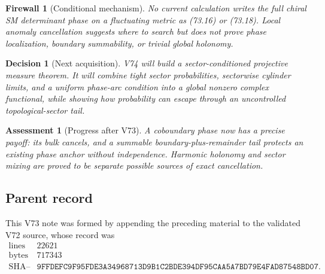 \documentclass[11pt]{article}
\newtheorem{assessment}[theorem]{Assessment}
\newtheorem{firewall}[theorem]{Firewall}
\newtheorem{decision}[theorem]{Decision}
\begin{document}
\begin{firewall}[Conditional mechanism]
\label{fire:v11v73-boundary}
No current calculation writes the full chiral SM determinant phase on
a fluctuating metric as (73.16) or (73.18).  Local anomaly cancellation
suggests where to search but does not prove phase localization,
boundary summability, or trivial global holonomy.
\end{firewall}

\begin{decision}[Next acquisition]
\label{dec:v11v73-next}
V74 will build a sector-conditioned projective measure theorem.  It
will combine tight sector probabilities, sectorwise cylinder limits,
and a uniform phase-arc condition into a global nonzero complex
functional, while showing how probability can escape through an
uncontrolled topological-sector tail.
\end{decision}

\begin{assessment}[Progress after V73]
\label{ass:v11v73-status}
A coboundary phase now has a precise payoff: its bulk cancels, and a
summable boundary-plus-remainder tail protects an existing phase
anchor without independence.  Harmonic holonomy and sector mixing are
proved to be separate possible sources of exact cancellation.
\end{assessment}

\subsection{Parent record}

This V73 note was formed by appending the preceding material to the
validated V72 source, whose record was
\[
\begin{array}{c|c}
\text{lines}&22621\\
\text{bytes}&717343\\
\text{SHA--256}&
\texttt{9FFDEFC9F95FDE3A34968713D9B1C2BDE394DF95CAA5A7BD79E4FAD87548BD07}.
\end{array}                                                     \tag{73.19}
\]

\end{document}
